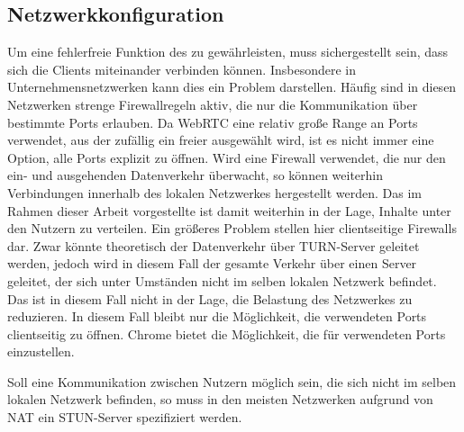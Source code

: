 
\subsection{Netzwerkkonfiguration}

Um eine fehlerfreie Funktion des \cdns zu gewährleisten, muss sichergestellt sein, dass sich die Clients miteinander verbinden können. Insbesondere in Unternehmensnetzwerken kann dies ein Problem darstellen. Häufig sind in diesen Netzwerken strenge Firewallregeln aktiv, die nur die Kommunikation über bestimmte Ports erlauben. Da WebRTC eine relativ große Range an Ports verwendet, aus der zufällig ein freier ausgewählt wird, ist es nicht immer eine Option, alle Ports explizit zu öffnen. Wird eine Firewall verwendet, die nur den ein- und ausgehenden Datenverkehr überwacht, so können weiterhin Verbindungen innerhalb des lokalen Netzwerkes hergestellt werden. Das im Rahmen dieser Arbeit vorgestellte \cdn ist damit weiterhin in der Lage, Inhalte unter den Nutzern zu verteilen. Ein größeres Problem stellen hier clientseitige Firewalls dar. Zwar könnte theoretisch der Datenverkehr über TURN-Server geleitet werden, jedoch wird in diesem Fall der gesamte Verkehr über einen Server geleitet, der sich unter Umständen nicht im selben lokalen Netzwerk befindet. Das \cdn ist in diesem Fall nicht in der Lage, die Belastung des Netzwerkes zu reduzieren. In diesem Fall bleibt nur die Möglichkeit, die verwendeten Ports clientseitig zu öffnen. Chrome bietet die Möglichkeit, die für \webrtc verwendeten Ports einzustellen.\cite{chrome-port-range} 

Soll eine Kommunikation zwischen Nutzern möglich sein, die sich nicht im selben lokalen Netzwerk befinden, so muss in den meisten Netzwerken aufgrund von NAT ein STUN-Server spezifiziert werden.  
